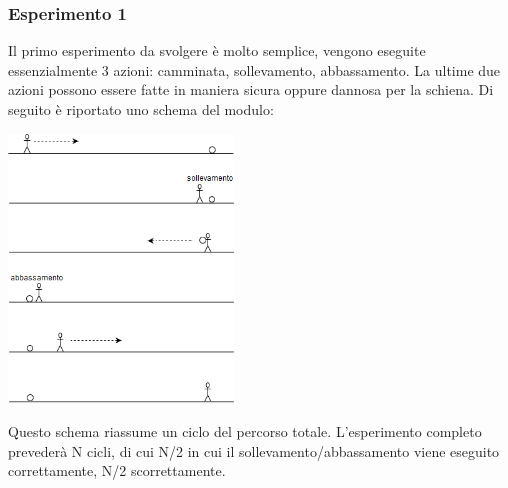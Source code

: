 \documentclass[a4paper]{article}
\begin{document}
	\subsubsection{Esperimento 1}
Il primo esperimento da svolgere è molto semplice, vengono eseguite essenzialmente 3 azioni: camminata, sollevamento, abbassamento.
La ultime due azioni possono essere fatte in maniera sicura oppure dannosa per la schiena.
Di seguito è riportato uno schema del modulo:\\

\begin{center}
    \includegraphics[width=60mm,scale=0.7]{./images/esperimento1.png} 
\end{center} 

Questo schema riassume un ciclo del percorso totale. L’esperimento completo prevederà N cicli, di cui N/2 in cui il sollevamento/abbassamento viene eseguito correttamente, N/2 scorrettamente.
\end{document}
